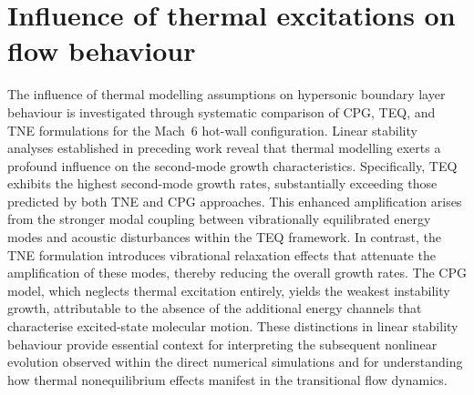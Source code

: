 

\section{Influence of thermal excitations on flow behaviour}

The influence of thermal modelling assumptions on hypersonic boundary layer behaviour is investigated through systematic comparison of \gls{CPG}, \gls{TEQ}, and \gls{TNE} formulations for the Mach~6 hot-wall configuration. Linear stability analyses established in preceding work reveal that thermal modelling exerts a profound influence on the second-mode growth characteristics. Specifically, \gls{TEQ} exhibits the highest second-mode growth rates, substantially exceeding those predicted by both \gls{TNE} and \gls{CPG} approaches. This enhanced amplification arises from the stronger modal coupling between vibrationally equilibrated energy modes and acoustic disturbances within the \gls{TEQ} framework. In contrast, the \gls{TNE} formulation introduces vibrational relaxation effects that attenuate the amplification of these modes, thereby reducing the overall growth rates. The \gls{CPG} model, which neglects thermal excitation entirely, yields the weakest instability growth, attributable to the absence of the additional energy channels that characterise excited-state molecular motion. These distinctions in linear stability behaviour provide essential context for interpreting the subsequent nonlinear evolution observed within the direct numerical simulations and for understanding how thermal nonequilibrium effects manifest in the transitional flow dynamics.

